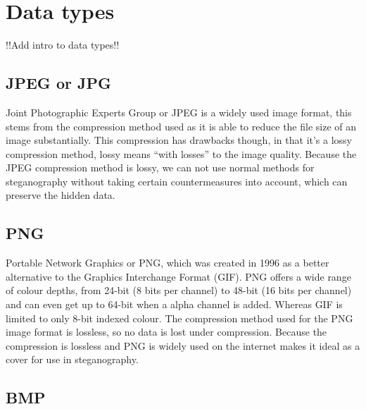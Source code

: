 \section{Data types}
!!Add intro to data types!!

\subsection{JPEG or JPG}
Joint Photographic Experts Group or JPEG is a widely used image format, this stems from the compression method used as it is able to reduce the file size of an image substantially.
This compression has drawbacks though, in that it's a lossy compression method, lossy means ``with losses'' to the image quality.
Because the JPEG compression method is lossy, we can not use normal methods for steganography without taking certain countermeasures into account, which can preserve the hidden data.
\iffalse{TODO: need to specify which countermeasures and rewrite the ending}\fi


\subsection{PNG}
Portable Network Graphics or PNG, which was created in 1996 as a better alternative to the Graphics Interchange Format (GIF).
PNG offers a wide range of colour depths, from 24-bit (8 bits per channel) to 48-bit (16 bits per channel) and can even get up to 64-bit when a alpha channel is added.
Whereas GIF is limited to only 8-bit indexed colour.
The compression method used for the PNG image format is lossless, so no data is lost under compression.
Because the compression is lossless and PNG is widely used on the internet makes it ideal as a cover for use in steganography.


\subsection{BMP}


